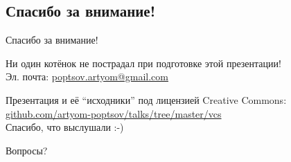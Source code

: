 \documentclass[presentation]{beamer}
\begin{document}
\subsection{Спасибо за внимание!}
\begin{frame}{Спасибо за внимание!}
  \large

  \raisebox{-.30em}{\Large\HandRight}\hspace{.25em} Ни один котёнок не
  пострадал при подготовке этой презентации! \\[30pt]

  Эл. почта: \url{poptsov.artyom@gmail.com}

  \medskip

  Презентация и её ``исходники'' под лицензией Creative Commons:
  \url{github.com/artyom-poptsov/talks/tree/master/vcs} \\[10pt]

  Спасибо, что выслушали  :-) \\[30pt]

  \bigskip

  \huge Вопросы?
\end{frame}


\end{document}

